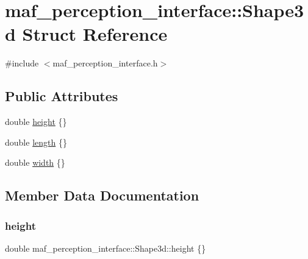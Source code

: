 \hypertarget{structmaf__perception__interface_1_1Shape3d}{}\section{maf\+\_\+perception\+\_\+interface\+:\+:Shape3d Struct Reference}
\label{structmaf__perception__interface_1_1Shape3d}


{\ttfamily \#include $<$maf\+\_\+perception\+\_\+interface.\+h$>$}

\subsection*{Public Attributes}
\begin{DoxyCompactItemize}
\item 
double \hyperlink{structmaf__perception__interface_1_1Shape3d_af0c7489ef9709be665394ab0d992e257}{height} \{\}
\item 
double \hyperlink{structmaf__perception__interface_1_1Shape3d_a4ad2725c9857a0d1e73c54e7d8626898}{length} \{\}
\item 
double \hyperlink{structmaf__perception__interface_1_1Shape3d_a2e9aa6c0086541afa74a50584543404d}{width} \{\}
\end{DoxyCompactItemize}


\subsection{Member Data Documentation}
\mbox{\label{structmaf__perception__interface_1_1Shape3d_af0c7489ef9709be665394ab0d992e257}} 
\subsubsection{\texorpdfstring{height}{height}}
{\footnotesize\ttfamily double maf\+\_\+perception\+\_\+interface\+::\+Shape3d\+::height \{\}}

\mbox{\label{structmaf__perception__interface_1_1Shape3d_a4ad2725c9857a0d1e73c54e7d8626898}} 
